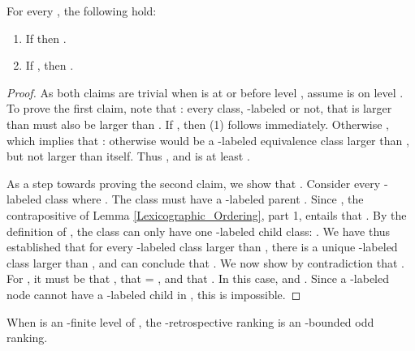 \documentclass{LMCS}
\begin{document}
\begin{lem}\label{Ranking_Respects_Preorder} For every , the following hold:
\begin{enumerate}[\em(1)]
\item If  then .
\item If , then .
\end{enumerate}
\end{lem}
\begin{proof}
As both claims are trivial when  is at or before level , assume  is on level . To prove
the first claim, note that : every class, -labeled
or not, that is larger than  must also be larger than . If , then
(1) follows immediately.  Otherwise , which implies that
: otherwise  would be a -labeled equivalence class larger than ,
but not larger than itself. Thus , and  is at least .

As a step towards proving the second claim, we show that . Consider
every -labeled class  where . The class  must have a
-labeled parent .  Since , the contrapositive of
Lemma \ref{Lexicographic_Ordering}, part 1, entails that .  By the definition of ,
the class
 can only have one -labeled child class: .  We have thus established
that for every -labeled class larger than , there is a unique -labeled class larger
than , and can conclude that .  We now show by contradiction that
. For , it must be that
, that  = , and that . In this case,  and .  Since a
-labeled node cannot have a -labeled child in , this is impossible.
\end{proof}

When  is an -finite level of , the -retrospective ranking is an -bounded odd ranking.
\end{document}
